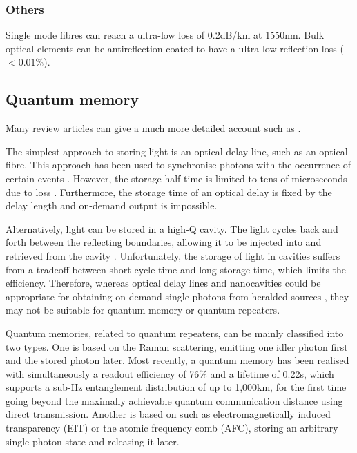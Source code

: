 \documentclass[aps,rmp,twocolumn,amsmath,amssymb,nofootinbib,superscriptaddress,longbibliography,floatfix,table-of-contents,eqsecnum]{revtex4-1}
\begin{document}
%
%

\subsubsection{Others}

Single mode fibres can reach a ultra-low loss of 0.2dB/km at 1550nm. Bulk optical elements can be antireflection-coated to have a ultra-low reflection loss ($<0.01\%$).

%
%

\subsection{Quantum memory} 

Many review articles can give a much more detailed account such as \cite{lvovsky2009optical, simon2010quantum, sangouard2011quantum, bussieres2013prospective, reiserer2015cavity}.

The simplest approach to storing light is an optical delay line, such as an optical fibre. This approach has been used to synchronise photons with the occurrence of certain events \cite{landry2007quantum}. However, the storage half-time is limited to tens of microseconds due to loss \cite{lvovsky2009optical}. Furthermore, the storage time of an optical delay is fixed by the delay length and on-demand output is impossible.

Alternatively, light can be stored in a high-Q cavity. The light cycles back and forth between the reflecting boundaries, allowing it to be injected into and retrieved from the cavity \cite{pittman2002single, pittman2002cyclical, leung2006quantum, maitre1997quantum, tanabe2007trapping, tanabe2009dynamic}. Unfortunately, the storage of light in cavities suffers from a tradeoff between short cycle time and long storage time, which limits the efficiency. Therefore, whereas optical delay lines and nanocavities could be appropriate for obtaining on-demand single photons from heralded sources \cite{saglamyurek2015quantum, jin2015telecom}, they may not be suitable for quantum memory or quantum repeaters.

Quantum memories, related to quantum repeaters, can be mainly classified into two types. One is based on the Raman scattering, emitting one idler photon first and the stored photon later. Most recently, a quantum memory has been realised with simultaneously a readout efficiency of 76\% and a lifetime of 0.22s, which supports a sub-Hz entanglement distribution of up to 1,000km, for the first time going beyond the maximally achievable quantum communication distance using direct transmission. Another is based on such as electromagnetically induced transparency (EIT) or the atomic frequency comb (AFC), storing an arbitrary single photon state and releasing it later.
\end{document}

